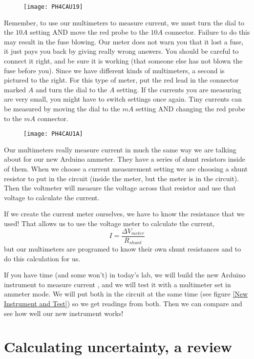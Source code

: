 \begin{figure}[h!]
\texttt{[image: PH4CAU19]}
\end{figure} Remember, to use our multimeters
to measure current, we must turn the dial to the $10\unit{A}$ setting AND
move the red probe to the $10\unit{A}$ connector. Failure to do this may
result in the fuse blowing. Our meter does not warn you that it lost a fuse,
it just pays you back by giving really wrong answers. You should be careful
to connect it right, and be sure it is working (that someone else has not
blown the fuse before you). Since we have different kinds of multimeters, a
second is pictured to the right. For this type of meter, put the red lead in
the connector marked $A$ and turn the dial to the $A$ setting. If the
currents you are measuring are very small, you might have to switch settings
once again. Tiny currents can be measured by moving the dial to the $\unit{mA%
}$ setting AND changing the red probe to the $\unit{mA}$ connector.\begin{figure}[h!]
\texttt{[image: PH4CAU1A]}
\end{figure}

Our multimeters really measure current in much the same way we are talking
about for our new Arduino ammeter. They have a series of shunt resistors
inside of them. When we choose a current measurement setting we are choosing
a shunt resistor to put in the circuit (inside the meter, but the meter is
in the circuit). Then the voltmeter will measure the voltage across that
resistor and use that voltage to calculate the current.

If we create the current meter ourselves, we have to know the resistance
that we used! That allows us to use the voltage meter to calculate the
current,%
\begin{equation*}
I=\frac{\Delta V_{meter}}{R_{shunt}}
\end{equation*}%
but our multimeters are programed to know their own shunt resistances and to
do this calculation for us.

If you have time (and some won't) in today's lab, we will build the new
Arduino instrument to measure current , and we will test it with a
multimeter set in ammeter mode. We will put both in the circuit at the same
time (see figure \ref{New Instrument and Test}) so we get readings from
both. Then we can compare and see how well our new instrument works!

\section{Calculating uncertainty, a review}

